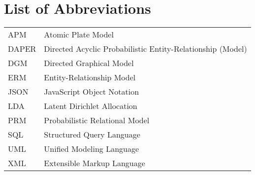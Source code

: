 \section*{List of Abbreviations}

\begin{tabular}{ll}
APM & Atomic Plate Model\\
DAPER & Directed Acyclic Probabilistic Entity-Relationship (Model)\\
DGM & Directed Graphical Model\\
ERM & Entity-Relationship Model\\
JSON & JavaScript Object Notation\\
LDA & Latent Dirichlet Allocation\\
PRM & Probabilistic Relational Model\\
SQL & Structured Query Language\\
UML & Unified Modeling Language\\
XML & Extensible Markup Language

\end{tabular}